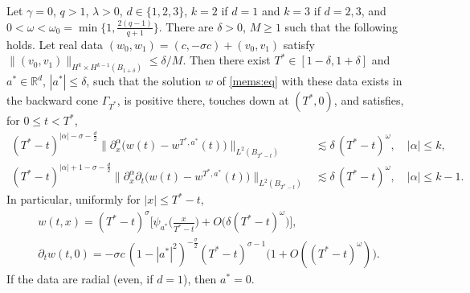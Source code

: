 \begin{theorem}\label{mems:thm-main}
Let $\gamma=0$, $q>1$, $\lambda>0$, $d\in\{1,2,3\}$, $k=2$ if $d=1$ and $k=3$ if
$d=2,3$, and $0<\omega<\omega_0=\min\{1,\frac{2(q-1)}{q+1}\}$. There are
$\delta>0$, $M\ge1$ such that the following holds. Let real data
$(w_0,w_1)=(c,-\sigma c)+(v_0,v_1)$ satisfy
$\|(v_0,v_1)\|_{H^k\times H^{k-1}(B_{1+\delta})}\le\delta/M$. Then there exist
$T^*\in[1-\delta,1+\delta]$ and $a^*\in\mathbb R^d$, $|a^*|\le\delta$, such that the
solution $w$ of \eqref{mems:eq} with these data exists in the backward cone
$\Gamma_{T^*}$, is positive there, touches down at $(T^*,0)$, and satisfies, for
$0\le t<T^*$,
\begin{align*}
  (T^*-t)^{|\alpha|-\sigma-\frac d2}\big\|\partial_x^\alpha\big(w(t)-w^{T^*,a^*}(t)\big)\big\|_{L^2(B_{T^*-t})}&\lesssim\delta\,(T^*-t)^{\omega},\quad|\alpha|\le k,\\
  (T^*-t)^{|\alpha|+1-\sigma-\frac d2}\big\|\partial_x^\alpha\partial_t\big(w(t)-w^{T^*,a^*}(t)\big)\big\|_{L^2(B_{T^*-t})}&\lesssim\delta\,(T^*-t)^{\omega},\quad|\alpha|\le k-1.
\end{align*}
In particular, uniformly for $|x|\le T^*-t$,
\begin{gather*}
  w(t,x)=(T^*-t)^{\sigma}\Big[\psi_{a^*}\Big(\frac{x}{T^*-t}\Big)+O\big(\delta(T^*-t)^{\omega}\big)\Big],\\
  \partial_tw(t,0)=-\sigma c\,(1-|a^*|^2)^{-\frac\sigma2}(T^*-t)^{\sigma-1}\big(1+O((T^*-t)^{\omega})\big).
\end{gather*}
If the data are radial (even, if $d=1$), then $a^*=0$.
\end{theorem}

